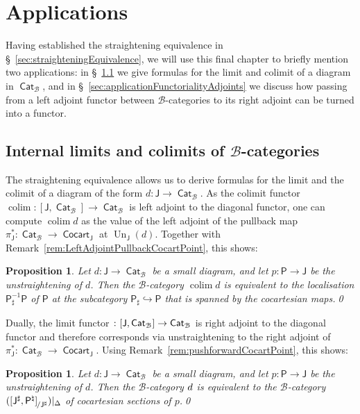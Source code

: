 \documentclass[reqno]{amsart}
\numberwithin{equation}{subsection}
\theoremstyle{plain}
\newtheorem{proposition}[equation]{Proposition}
\theoremstyle{definition}
\let\scr=\mathcal
\let\into=\hookrightarrow
\def\BB{\scr B}
\DeclareMathOperator{\ICat}{\mathsf{Cat}}
\DeclareMathOperator{\ICocart}{\mathsf{Cocart}}
\DeclareMathOperator{\Un}{Un}
\newcommand{\Over}[2]{#1_{\hspace{-1pt}/#2}}
\newcommand{\I}[1]{\mathsf{#1}}
\newcommand{\iFun}[2]{{[#1,#2]}}
\let\lim=\relax
\DeclareMathOperator*{\lim}{lim}
\DeclareMathOperator*{\colim}{colim}
\begin{document}
\section{Applications}
\label{sec:app}
Having established the straightening equivalence in \S~\ref{sec:straighteningEquivalence}, we will use this final chapter to briefly mention two applications: in \S~\ref{sec:applicationLimitsColimits} we give formulas for the limit and colimit of a diagram in $\ICat_{\BB}$, and in \S~\ref{sec:applicationFunctorialityAdjoints} we discuss how passing from a left adjoint functor between $\BB$-categories to its right adjoint can be turned into a functor.
\subsection{Internal limits and colimits of $\BB$-categories}
\label{sec:applicationLimitsColimits}
The straightening equivalence allows us to derive formulas for the limit and the colimit of a diagram of the form $d\colon\I{J}\to\ICat_{\BB}$. As the colimit functor $\colim\colon \iFun{\I{J}}{\ICat_{\BB}}\to\ICat_{\BB}$ is left adjoint to the diagonal functor, one can compute $\colim d$ as the value of the left adjoint of the pullback map $\pi_{\I{J}}^\ast\colon\ICat_{\BB}\to\ICocart_{\I{J}}$ at $\Un_{\I{J}}(d)$. Together with Remark~\ref{rem:LeftAdjointPullbackCocartPoint}, this shows:
\begin{proposition}
	\label{prop:formulaColimitsCatB}
	Let $d\colon \I{J}\to\ICat_{\BB}$ be a small diagram, and let $p\colon\I{P}\to\I{J}$ be the unstraightening of $d$. Then the $\BB$-category $\colim d$ is equivalent to the localisation $\I{P}_\sharp^{-1}\I{P}$ of $\I{P}$ at the subcategory $\I{P}_\sharp\into\I{P}$ that is spanned by the cocartesian maps.\qed
\end{proposition}
Dually, the limit functor $\lim\colon\iFun{\I{J}}{\ICat_{\BB}}\to\ICat_{\BB}$ is right adjoint to the diagonal functor and therefore corresponds via unstraightening to the right adjoint of $\pi_{\I{J}}^\ast\colon \ICat_{\BB}\to\ICocart_{\I{J}}$. Using Remark~\ref{rem:pushforwardCocartPoint}, this shows:
\begin{proposition}
	\label{prop:formulaLimitsCatB}
	Let $d\colon \I{J}\to\ICat_{\BB}$ be a small diagram, and let $p\colon\I{P}\to\I{J}$ be the unstraightening of $d$. Then the $\BB$-category $\lim d$ is equivalent to the $\BB$-category $(\Over{\iFun{\I{J}^\sharp}{\I{P}^\natural}}{\I{J}^\sharp})\vert_{\Delta}$ of cocartesian sections of $p$.\qed
\end{proposition}
\end{document}
